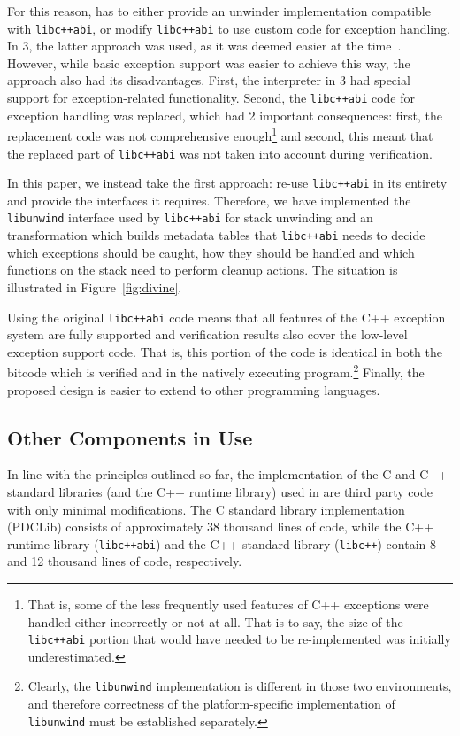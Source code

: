 For this reason, \divine{} has to either provide an unwinder implementation
compatible with \texttt{libc++abi}, or modify \texttt{libc++abi} to use
custom code for exception handling. In \divine{} 3, the latter approach was
used, as it was deemed easier at the
time~\cite{rockai16:model.checkin}. However, while basic exception
support was easier to achieve this way, the approach also had its
disadvantages. First, the \llvm{} interpreter in \divine{} 3 had special
support for exception-related functionality. Second, the
\texttt{libc++abi} code for exception handling was replaced, which had 2
important consequences: first, the replacement code was not
comprehensive enough\footnote{That is, some of the less frequently used
  features of C++ exceptions were handled either incorrectly or not at
  all. That is to say, the size of the \texttt{libc++abi} portion that
  would have needed to be re-implemented was initially underestimated.}
and second, this meant that the replaced part of \texttt{libc++abi} was
not taken into account during verification.

In this paper, we instead take the first approach: re-use
\texttt{libc++abi} in its entirety and provide the interfaces it
requires. Therefore, we have implemented the \texttt{libunwind}
interface used by \texttt{libc++abi} for stack unwinding and an \llvm{}
transformation which builds metadata tables that \texttt{libc++abi}
needs to decide which exceptions should be caught, how they should be
handled and which functions on the stack need to perform cleanup
actions. The situation is illustrated in Figure~\ref{fig:divine}.

Using the original \texttt{libc++abi} code means that all features of
the C++ exception system are fully supported and verification results
also cover the low-level exception support code. That is, this portion
of the code is identical in both the bitcode which is verified and in
the natively executing program.\footnote{Clearly, the \texttt{libunwind}
  implementation is different in those two environments, and therefore
  correctness of the platform-specific implementation of
  \texttt{libunwind} must be established separately.} Finally, the
proposed design is easier to extend to other programming languages.

\subsection{Other Components in Use}\label{sec:components}

In line with the principles outlined so far, the implementation of the C
and C++ standard libraries (and the C++ runtime library) used in \divine{}
are third party code with only minimal modifications. The C standard
library implementation (PDCLib) consists of approximately 38 thousand
lines of code, while the C++ runtime library (\texttt{libc++abi}) and
the C++ standard library (\texttt{libc++}) contain 8 and 12 thousand
lines of code, respectively.

